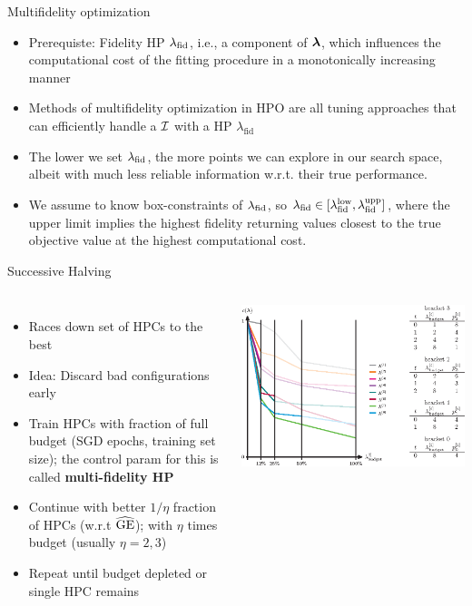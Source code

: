 \documentclass[11pt,compress,t,notes=noshow, xcolor=table]{beamer}
\begin{document}
\begin{vbframe}{Multifidelity optimization}
\begin{itemize}
\item Prerequiste: Fidelity  HP $\lambda_{\text{fid}}$, i.e.,  a  component  of $\bm{\lambda}$,  which  influences  the computational  cost  of  the  fitting  procedure  in  a  monotonically  increasing  manner
\item Methods of multifidelity optimization in HPO are all tuning  approaches  that  can  efficiently handle  a $\mathcal{I}$ with  a  HP $\lambda_{\text{fid}}$
\item The  lower  we  set $\lambda_{\text{fid}}$,  the more points we can explore in our search space, albeit with much less reliable information w.r.t. their true performance.
\item We  assume  to  know  box-constraints  of $\lambda_{\text{fid}}$,  so $\lambda_{\text{fid}} \in [\lambda_{\text{fid}}^{\textrm{low}}, \lambda_{\text{fid}}^{\textrm{upp}}]$,  where  the  upper  limit  implies  the  highest  fidelity  returning  values closest to the true objective value at the highest computational cost.
\end{itemize}
\end{vbframe}

\begin{vbframe}{Successive Halving}

\begin{columns}
\begin{itemize}
\item Races down set of HPCs to the best
\item Idea: Discard bad configurations early
\item Train HPCs with fraction of full budget (SGD epochs, training set size); the control param for this is called \textbf{multi-fidelity HP}
\item Continue with better $1/\eta$ fraction of HPCs (w.r.t $\widehat{\mathrm{GE}}{}$);
with $\eta$ times budget (usually $\eta = 2,3$)
\item Repeat until budget depleted or single HPC remains
\end{itemize}
\begin{center}
\includegraphics[trim=0 0 100 0, clip, width = 1.0\textwidth]{figure/hyperband.eps}
\end{center}
\end{columns}
\end{vbframe}
\end{document}
